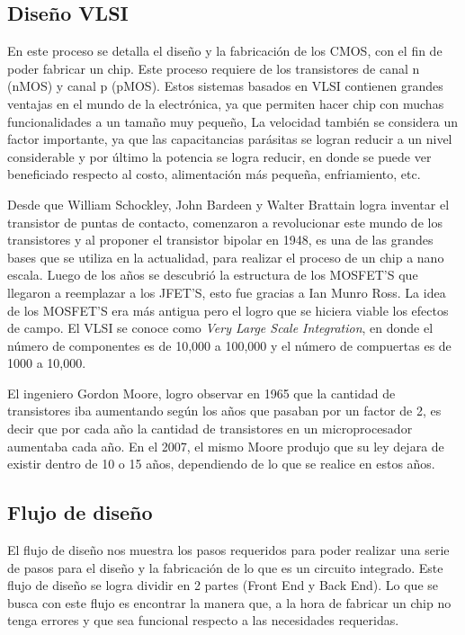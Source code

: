 \subsection*{Diseño VLSI}


En este proceso se detalla el diseño y la fabricación de los CMOS, con el fin de poder fabricar un chip. Este proceso requiere de los transistores de canal n (nMOS) y canal p (pMOS).
Estos sistemas basados en VLSI contienen grandes ventajas en el mundo de la electrónica, ya que permiten hacer chip con muchas funcionalidades a un tamaño muy pequeño, La velocidad también se considera un factor importante, ya que las capacitancias parásitas se logran reducir a un nivel considerable y por último la potencia se logra reducir, en donde se puede ver beneficiado respecto al costo, alimentación más pequeña, enfriamiento, etc.

Desde que William Schockley, John Bardeen y Walter Brattain logra inventar el transistor de puntas de contacto, comenzaron a revolucionar este mundo de los transistores y al proponer el transistor bipolar en 1948, es una de las grandes bases que se utiliza en la actualidad, para realizar el proceso de un chip a nano escala. 
Luego de los años se descubrió la estructura de los MOSFET'S que llegaron a reemplazar a los JFET'S, esto fue gracias a Ian Munro Ross. La idea de los MOSFET'S era más antigua pero el logro que se hiciera viable los efectos de campo.
El VLSI se conoce como \textit{Very Large Scale Integration}, en donde el número de componentes es de 10,000 a 100,000 y el número de compuertas es de 1000 a 10,000. 

El ingeniero Gordon Moore, logro observar en 1965 que la cantidad de transistores iba aumentando según los años que pasaban por un factor de 2, es decir que por cada año la cantidad de transistores en un microprocesador aumentaba cada año. En el 2007, el mismo Moore produjo que su ley dejara de existir dentro de 10 o 15 años, dependiendo de lo que se realice en estos años.

\cite{hoover2010bio} \cite{park2014design}


\subsection*{Flujo de diseño}


El flujo de diseño nos muestra los pasos requeridos para poder realizar una serie de pasos para el diseño y la fabricación de lo que es un circuito integrado. Este flujo de diseño se logra dividir en 2 partes (Front End y Back End). Lo que se busca con este flujo es encontrar la manera que, a la hora de fabricar un chip no tenga errores y que sea funcional respecto a las necesidades requeridas.


